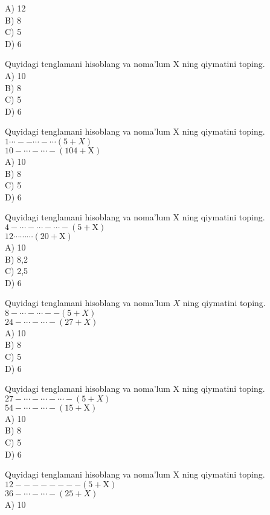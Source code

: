 A) 12\\
B) 8\\
C) 5\\
D) 6
  \item Quyidagi tenglamani hisoblang va noma'lum X ning qiymatini toping.\\
A) 10\\
B) 8\\
C) 5\\
D) 6
  \item Quyidagi tenglamani hisoblang va noma'lum X ning qiymatini toping.\\
$1 \cdots--\cdots-\cdots(5+X)$\\
$10-\cdots-\cdots-(104+\mathrm{X})$\\
A) 10\\
B) 8\\
C) 5\\
D) 6
  \item Quyidagi tenglamani hisoblang va noma'lum X ning qiymatini toping.\\
$4-\cdots-\cdots-\cdots-(5+\mathrm{X})$\\
$12 \cdots \cdots \cdots(20+\mathrm{X})$\\
A) 10\\
B) 8,2\\
C) 2,5\\
D) 6
  \item Quyidagi tenglamani hisoblang va noma'lum $X$ ning qiymatini toping.\\
$8-\cdots-\cdots--(5+X)$\\
$24-\cdots-\cdots-(27+X)$\\
A) 10\\
B) 8\\
C) 5\\
D) 6
  \item Quyidagi tenglamani hisoblang va noma'lum X ning qiymatini toping.\\
$27-\cdots-\cdots-\cdots-(5+X)$\\
$54-\cdots-\cdots-(15+\mathrm{X})$\\
A) 10\\
B) 8\\
C) 5\\
D) 6
  \item Quyidagi tenglamani hisoblang va noma'lum X ning qiymatini toping.\\
$12--------(5+\mathrm{X})$\\
$36-\cdots-\cdots-(25+X)$\\
A) 10\\

